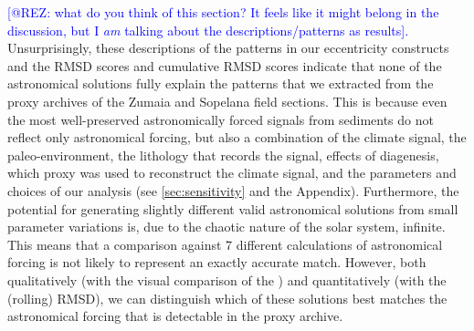 \documentclass[draft]{agujournal2019}
\newcommand{\ijk}{\textcolor{blue}}
\begin{document}
\ijk{[@REZ: what do you think of this section? It feels like it might belong in the discussion, but I \emph{am} talking about the descriptions/patterns as results].}
Unsurprisingly, these descriptions of the patterns in our eccentricity constructs and the \gls{RMSD} scores and cumulative \gls{RMSD} scores indicate that none of the astronomical solutions fully explain the patterns that we extracted from the proxy archives of the Zumaia and Sopelana field sections.
This is because even the most well-preserved astronomically forced signals from sediments do not reflect only astronomical forcing, but also a combination of the climate signal, the paleo-environment, the lithology that records the signal, effects of diagenesis, which proxy was used to reconstruct the climate signal, and the parameters and choices of our analysis (see \cref{sec:sensitivity} and the Appendix).
Furthermore, the potential for generating slightly different valid astronomical solutions from small parameter variations is, due to the chaotic nature of the solar system, infinite.
This means that a comparison against 7 different calculations of astronomical forcing is not likely to represent an exactly accurate match.
However, both qualitatively (with the visual comparison of the ) and quantitatively (with the (rolling) \gls{RMSD}), we can distinguish which of these solutions best matches the astronomical forcing that is detectable in the proxy archive.
\end{document}
